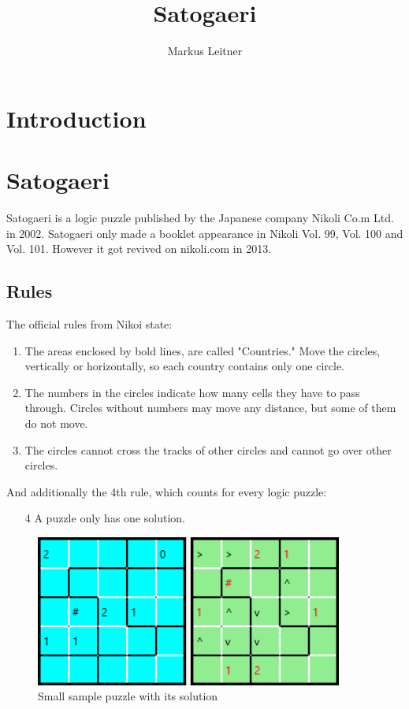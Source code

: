 \documentclass[a4paper,10pt]{paper}
\begin{document}
\title{Satogaeri}
\author{Markus Leitner}
\maketitle 
\tableofcontents

\section{Introduction}



\section{Satogaeri}
Satogaeri is a logic puzzle published by the Japanese company Nikoli Co.m Ltd. in 2002. Satogaeri only made a booklet appearance in Nikoli Vol. 99, Vol. 100 and Vol. 101. However it got revived on nikoli.com in 2013.

\subsection{Rules}
The official rules from Nikoi state:

\begin{enumerate}
  \item The areas enclosed by bold lines, are called "Countries." Move the circles, vertically or horizontally, so each country contains only one circle.
  \item The numbers in the circles indicate how many cells they have to pass through. Circles without numbers may move any distance, but some of them do not move.
  \item The circles cannot cross the tracks of other circles and cannot go over other circles. 
\end{enumerate}
And additionally the 4th rule, which counts for every logic puzzle:
\begin{enumerate}
  \item[4] A puzzle only has one solution.
\end{enumerate}

\begin{figure}
  \centering
  \includegraphics[width=0.9\textwidth]{Pictures/sample_small.png} 
  \caption{Small sample puzzle with its solution}
  \label{fig:sample_small}
\end{figure}
\end{document}
